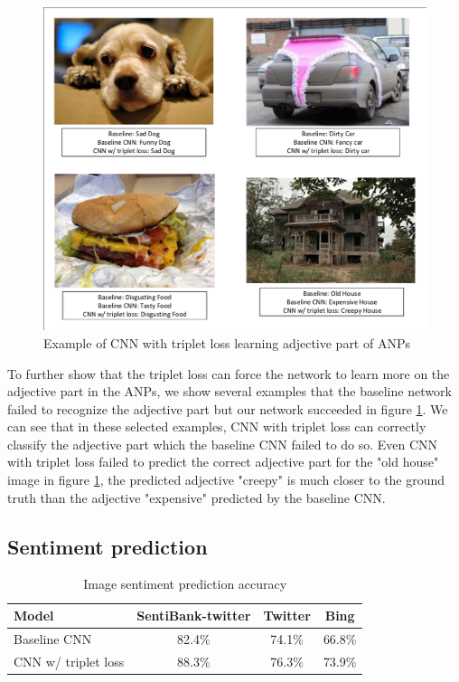 \begin{figure}[h]
    \centering
    \includegraphics[width=\linewidth]{./figures/adjective_example.pdf}
    \caption{Example of CNN with triplet loss learning adjective part of ANPs}
    \label{fig:example_adj}
\end{figure}

To further show that the triplet loss can force the network to learn more on the adjective part in the ANPs, we show several examples that the baseline network failed to recognize the adjective part but our network succeeded in figure \ref{fig:example_adj}. We can see that in these selected examples, CNN with triplet loss can correctly classify the adjective part which the baseline CNN failed to do so. Even CNN with triplet loss failed to predict the correct adjective part for the "old house" image in figure \ref{fig:example_adj}, the predicted adjective "creepy" is much closer to the ground truth than the adjective "expensive" predicted by the baseline CNN.

\subsection{Sentiment prediction}
\label{eval_sent}

\begin{table}[h]
		\caption{Image sentiment prediction accuracy}
		\label{table:sent_accuracy}
		\centering
		\begin{tabular}{l|ccc} \hline
			Model & SentiBank-twitter & Twitter & Bing \\ \hline
			Baseline CNN \cite{chen2014deepsentibank} & 82.4\% & 74.1\% & 66.8\%  \\ 
			CNN w/ triplet loss & 88.3\% & 76.3\% & 73.9\%  \\ \hline
		\end{tabular}
\end{table}

